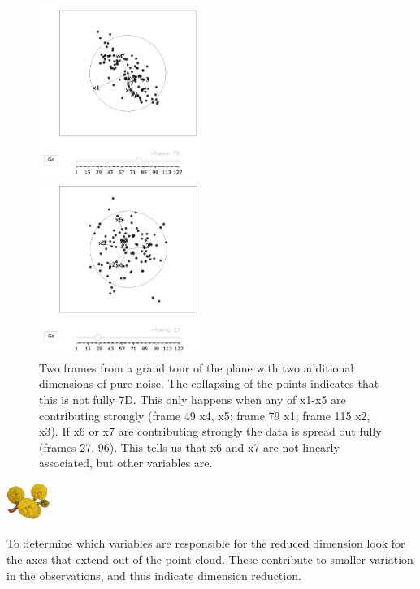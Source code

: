 \documentclass[
  letterpaper,
]{krantz}
\newcommand{\infobox}[1]{%
\noindent\colorbox{info!30}{%
\begin{minipage}{0.98\linewidth}%
    \centering%
    \begin{minipage}[c]{0.15\linewidth} %
      \includegraphics[width=1.5cm]{images/mulga-flowers2.png} %
    \end{minipage}%
    \hfill %
    \begin{minipage}[c]{0.8\linewidth} %
      \bigskip%
      \textsf{#1}%
      \bigskip%
    \end{minipage}%
    \hspace*{3mm}%
  \end{minipage}%
}%
}
\begin{document}
\begin{figure}

\begin{minipage}{0.50\linewidth}
\begin{center}
\includegraphics[width=2.08333in,height=\textheight]{images/plane_noise1.png}
\end{center}
\end{minipage}%
%
\begin{minipage}{0.50\linewidth}
\begin{center}
\includegraphics[width=2.08333in,height=\textheight]{images/plane_noise2.png}
\end{center}
\end{minipage}%

\caption{\label{fig-plane-noise-pdf}Two frames from a grand tour of the
plane with two additional dimensions of pure noise. The collapsing of
the points indicates that this is not fully 7D. This only happens when
any of x1-x5 are contributing strongly (frame 49 x4, x5; frame 79 x1;
frame 115 x2, x3). If x6 or x7 are contributing strongly the data is
spread out fully (frames 27, 96). This tells us that x6 and x7 are not
linearly associated, but other variables are.}

\end{figure}%

\infobox{To determine which variables are responsible for the reduced dimension look for the axes that extend out of the point cloud. These contribute to smaller variation in the observations, and thus indicate dimension reduction.}
\end{document}
